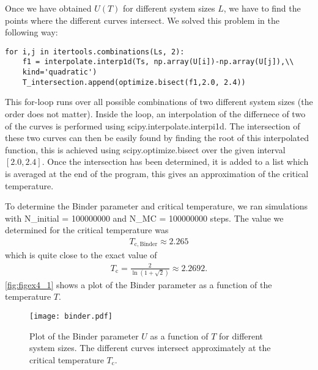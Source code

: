 \documentclass[a4paper,10pt,bibtotoc]{scrartcl}
\begin{document}
Once we have obtained $U(T)$ for different system sizes $L$, we have to find the points where the different curves intersect.
We solved this problem in the following way:
\begin{lstlisting}
for i,j in itertools.combinations(Ls, 2):
    f1 = interpolate.interp1d(Ts, np.array(U[i])-np.array(U[j]),\\
    kind='quadratic')    
    T_intersection.append(optimize.bisect(f1,2.0, 2.4))
\end{lstlisting}
This for-loop runs over all possible combinations of two different system sizes (the order does not matter).
Inside the loop, an interpolation of the differnece of two of the curves is performed using scipy.interpolate.interpi1d.
The intersection of these two curves can then be easily found by finding the root of this interpolated function, this is achieved using scipy.optimize.bisect over the given interval $[2.0,2.4]$.
Once the intersection has been determined, it is added to a list which is averaged at the end of the program, this gives an approximation of the critical temperature.

To determine the Binder parameter and critical temperature, we ran simulations with N\_initial = 100000000 and N\_MC = 100000000 steps.
The value we determined for the critical temperature was
\begin{align}
T_\mathrm{c, Binder} \approx 2.265
\end{align}
which is quite close to the exact value of
\begin{align}
T_\mathrm{c} = \frac{2}{\ln\left(1+\sqrt{2}\right)}\approx 2.2692.
\end{align}
\autoref{fig:figex4_1} shows a plot of the Binder parameter as a function of the temperature $T$.

\begin{figure}[H]
	\centering
	\texttt{[image: binder.pdf]}
	\caption{Plot of the Binder parameter $U$ as a function of $T$ for different system sizes. The different curves intersect approximately at the critical temperature $T_\mathrm{c}$.}
	\label{fig:figex4_1}
\end{figure}
\end{document}
